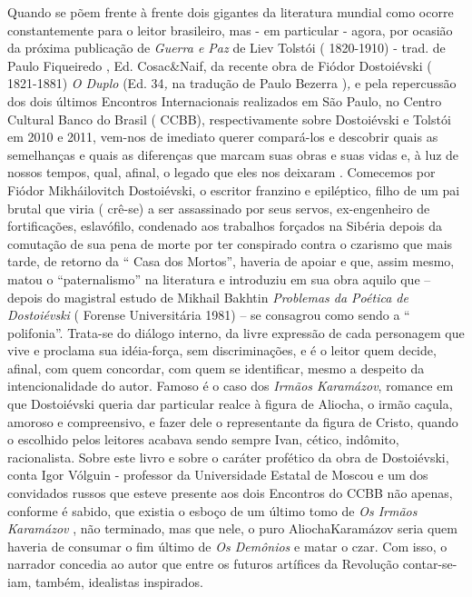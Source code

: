 Quando se põem frente à frente dois gigantes da literatura mundial como
ocorre constantemente para o leitor brasileiro, mas - em particular -
agora, por ocasião da próxima publicação de \emph{Guerra e Paz} de Liev
Tolstói ( 1820-1910) - trad. de Paulo Fiqueiredo , Ed. Cosac\&Naif, da
recente obra de Fiódor Dostoiévski ( 1821-1881) \emph{O Duplo} (Ed.
34\emph{,} na tradução de Paulo Bezerra )\emph{,} e pela repercussão dos
dois últimos Encontros Internacionais realizados em São Paulo, no Centro
Cultural Banco do Brasil ( CCBB), respectivamente sobre Dostoiévski e
Tolstói em 2010 e 2011, vem-nos de imediato querer compará-los e
descobrir quais as semelhanças e quais as diferenças que marcam suas
obras e suas vidas e, à luz de nossos tempos, qual, afinal, o legado que
eles nos deixaram . Comecemos por Fiódor Mikháilovitch Dostoiévski, o
escritor franzino e epiléptico, filho de um pai brutal que viria (
crê-se) a ser assassinado por seus servos, ex-engenheiro de
fortificações, eslavófilo, condenado aos trabalhos forçados na Sibéria
depois da comutação de sua pena de morte por ter conspirado contra o
czarismo que mais tarde, de retorno da `` Casa dos Mortos'', haveria de
apoiar e que, assim mesmo, matou o ``paternalismo'' na literatura e
introduziu em sua obra aquilo que -- depois do magistral estudo de
Mikhail Bakhtin \emph{Problemas da Poética de Dostoiévski} ( Forense
Universitária 1981) -- se consagrou como sendo a `` polifonia''.
Trata-se do diálogo interno, da livre expressão de cada personagem que
vive e proclama sua idéia-força, sem discriminações, e é o leitor quem
decide, afinal, com quem concordar, com quem se identificar, mesmo a
despeito da intencionalidade do autor. Famoso é o caso dos \emph{Irmãos
Karamázov}, romance em que Dostoiévski queria dar particular realce à
figura de Aliocha, o irmão caçula, amoroso e compreensivo, e fazer dele
o representante da figura de Cristo, quando o escolhido pelos leitores
acabava sendo sempre Ivan, cético, indômito, racionalista. Sobre este
livro e sobre o caráter profético da obra de Dostoiévski, conta Igor
Vólguin - professor da Universidade Estatal de Moscou e um dos
convidados russos que esteve presente aos dois Encontros do CCBB não
apenas, conforme é sabido, que existia o esboço de um último tomo de
\emph{Os Irmãos Karamázov} , não terminado, mas que nele, o puro
AliochaKaramázov seria quem haveria de consumar o fim último de \emph{Os
Demônios} e matar o czar. Com isso, o narrador concedia ao autor que
entre os futuros artífices da Revolução contar-se-iam, também,
idealistas inspirados.

